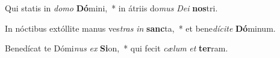 \item Qui statis in \textit{do}\textit{mo} \textbf{Dó}mini,~* in átriis do\textit{mus} \textit{De}\textit{i} \textbf{nos}tri.
\item In nóctibus extóllite manus ves\textit{tras} \textit{in} \textbf{sanc}ta,~* et bene\textit{dí}\textit{ci}\textit{te} \textbf{Dó}minum.
\item Benedícat te Dómi\textit{nus} \textit{ex} \textbf{Si}on,~* qui fecit \textit{cæ}\textit{lum} \textit{et} \textbf{ter}ram.
